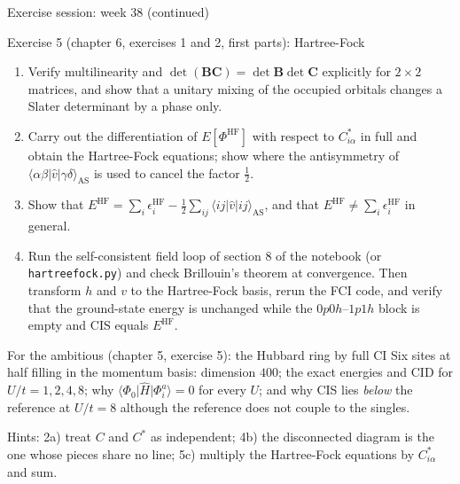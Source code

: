 \documentclass[aspectratio=169,10pt]{beamer}
\newcommand{\ket}[1]{\vert #1\rangle}
\newcommand{\bra}[1]{\langle #1\vert}
\newcommand{\element}[3]{\langle #1\vert #2\vert #3\rangle}
\begin{document}
\begin{frame}{Exercise session: week 38 (continued)}
  \footnotesize
  \begin{block}{Exercise 5 (chapter 6, exercises 1 and 2, first parts): Hartree-Fock}
    \begin{enumerate}
      \item[a)] Verify multilinearity and $\det(\bm{B}\bm{C})=\det\bm{B}\det\bm{C}$ explicitly for $2\times2$ matrices, and show that a unitary mixing of the occupied orbitals changes a Slater determinant by a phase only.
      \item[b)] Carry out the differentiation of $E[\Phi^{\mathrm{HF}}]$ with respect to $C_{i\alpha}^{*}$ in full and obtain the Hartree-Fock equations; show where the antisymmetry of $\element{\alpha\beta}{\hat{v}}{\gamma\delta}_{\mathrm{AS}}$ is used to cancel the factor $\frac12$.
      \item[c)] Show that $E^{\mathrm{HF}}=\sum_i\epsilon_i^{\mathrm{HF}}-\frac12\sum_{ij}\element{ij}{\hat{v}}{ij}_{\mathrm{AS}}$, and that $E^{\mathrm{HF}}\neq\sum_i\epsilon_i^{\mathrm{HF}}$ in general.
      \item[d)] Run the self-consistent field loop of section 8 of the notebook (or \texttt{hartreefock.py}) and check Brillouin's theorem at convergence. Then transform $h$ and $v$ to the Hartree-Fock basis, rerun the FCI code, and verify that the ground-state energy is unchanged while the $0p0h$--$1p1h$ block is empty and CIS equals $E^{\mathrm{HF}}$.
    \end{enumerate}
  \end{block}
  \begin{block}{For the ambitious (chapter 5, exercise 5): the Hubbard ring by full CI}
    Six sites at half filling in the momentum basis: dimension $400$; the exact energies and CID for $U/t=1,2,4,8$; why $\bra{\Phi_0}\hat{H}\ket{\Phi_i^a}=0$ for every $U$; and why CIS lies \emph{below} the reference at $U/t=8$ although the reference does not couple to the singles.
  \end{block}
  Hints: 2a) treat $C$ and $C^{*}$ as independent; 4b) the disconnected diagram is the one whose pieces share no line; 5c) multiply the Hartree-Fock equations by $C_{i\alpha}^{*}$ and sum.
\end{frame}
\end{document}
